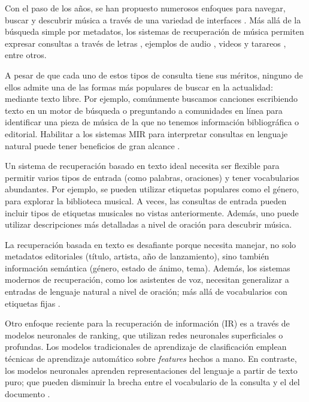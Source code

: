 Con el paso de los años, se han propuesto numerosos enfoques para navegar, buscar y descubrir música a través de una variedad de interfaces \cite{Manco2022ContrastiveAL}. Más allá de la búsqueda simple por metadatos, los sistemas de recuperación de música permiten expresar consultas a través de letras \cite{Tsukuda2017LyricJA}, ejemplos de audio \cite{Lee2020DisentangledMM}, videos \cite{Li2019QueryBV} y tarareos \cite{Patel2021MusicRS}, entre otros.

A pesar de que cada uno de estos tipos de consulta tiene sus méritos, ninguno de ellos admite una de las formas más populares de buscar en la actualidad: mediante texto libre. Por ejemplo, comúnmente buscamos canciones escribiendo texto en un motor de búsqueda o preguntando a comunidades en línea para identificar una pieza de música de la que no tenemos información bibliográfica o editorial. Habilitar a los sistemas MIR para interpretar consultas en lenguaje natural puede tener beneficios de gran alcance \cite{Manco2022ContrastiveAL}.

Un sistema de recuperación basado en texto ideal necesita ser flexible para permitir varios tipos de entrada (como palabras, oraciones) y tener vocabularios abundantes. Por ejemplo, se pueden utilizar etiquetas populares como el género, para explorar la biblioteca musical. A veces, las consultas de entrada pueden incluir tipos de etiquetas musicales no vistas anteriormente. Además, uno puede utilizar descripciones más detalladas a nivel de oración para descubrir música. %

La recuperación basada en texto es desafiante porque necesita manejar, no solo metadatos editoriales (título, artista, año de lanzamiento), sino también información semántica (género, estado de ánimo, tema). Además, los sistemas modernos de recuperación, como los asistentes de voz, necesitan generalizar a entradas de lenguaje natural a nivel de oración; más allá de vocabularios con etiquetas fijas \cite{Doh2022TowardUT}.

Otro enfoque reciente para la recuperación de información (IR) es a través de modelos neuronales de ranking, que utilizan redes neuronales superficiales o profundas. Los modelos tradicionales de aprendizaje de clasificación emplean técnicas de aprendizaje automático sobre \textit{features} hechos a mano. En contraste, los modelos neuronales aprenden representaciones del lenguaje a partir de texto puro; que pueden disminuir la brecha entre el vocabulario de la consulta y el del documento \cite{Mitra2017NeuralMF}.

